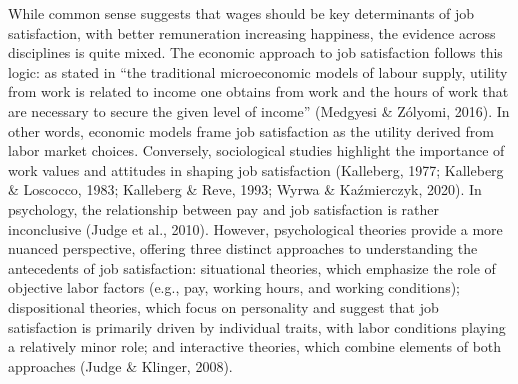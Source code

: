 \documentclass[
]{interact}
\begin{document}
While common sense suggests that wages should be key determinants of job
satisfaction, with better remuneration increasing happiness, the
evidence across disciplines is quite mixed. The economic approach to job
satisfaction follows this logic: as stated in ``the traditional
microeconomic models of labour supply, utility from work is related to
income one obtains from work and the hours of work that are necessary to
secure the given level of income'' (Medgyesi \& Zólyomi, 2016). In other
words, economic models frame job satisfaction as the utility derived
from labor market choices. Conversely, sociological studies highlight
the importance of work values and attitudes in shaping job satisfaction
(Kalleberg, 1977; Kalleberg \& Loscocco, 1983; Kalleberg \& Reve, 1993;
Wyrwa \& Kaźmierczyk, 2020). In psychology, the relationship between pay
and job satisfaction is rather inconclusive (Judge et al., 2010).
However, psychological theories provide a more nuanced perspective,
offering three distinct approaches to understanding the antecedents of
job satisfaction: situational theories, which emphasize the role of
objective labor factors (e.g., pay, working hours, and working
conditions); dispositional theories, which focus on personality and
suggest that job satisfaction is primarily driven by individual traits,
with labor conditions playing a relatively minor role; and interactive
theories, which combine elements of both approaches (Judge \& Klinger,
2008).
\end{document}
